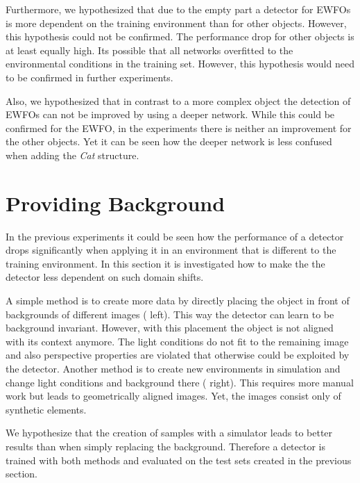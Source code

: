 Furthermore, we hypothesized that due to the empty part a detector for \acp{EWFO} is more dependent on the training environment than for other objects. However, this hypothesis could not be confirmed. The performance drop for other objects is at least equally high. Its possible that all networks overfitted to the environmental conditions in the training set. However, this hypothesis would need to be confirmed in further experiments.

Also, we hypothesized that in contrast to a more complex object the detection of \acp{EWFO} can not be improved by using a deeper network. While this could be confirmed for the \ac{EWFO}, in the experiments there is neither an improvement for the other objects. Yet it can be seen how the deeper network is less confused when adding the \textit{Cat} structure.

\section{Providing Background}
\label{sec:exp_background}
In the previous experiments it could be seen how the performance of a detector drops significantly when applying it in an environment that is different to the training environment. In this section it is investigated how to make the the detector less dependent on such domain shifts.

A simple method is to create more data by directly placing the object in front of backgrounds of different images ( left). This way the detector can learn to be background invariant. However, with this placement the object is not aligned with its context anymore. The light conditions do not fit to the remaining image and also perspective properties are violated that otherwise could be exploited by the detector. Another method is to create new environments in simulation and change light conditions and background there ( right). This requires more manual work but leads to geometrically aligned images. Yet, the images consist only of synthetic elements.

We hypothesize that the creation of samples with a simulator leads to better results than when simply replacing the background. Therefore a detector is trained with both methods and evaluated on the test sets created in the previous section.

